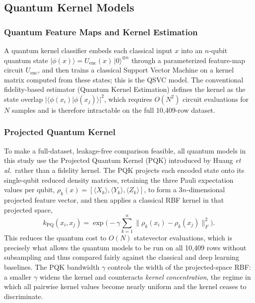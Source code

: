 \documentclass{ieeeaccess}
\begin{document}
\subsection{Quantum Kernel Models}
\label{subsec:quantum_methods}

\subsubsection{Quantum Feature Maps and Kernel Estimation}
A quantum kernel classifier embeds each classical input $x$ into an $n$-qubit quantum state $|\phi(x)\rangle = U_{\text{enc}}(x)\,|0\rangle^{\otimes n}$ through a parameterized feature-map circuit $U_{\text{enc}}$, and then trains a classical Support Vector Machine on a kernel matrix computed from these states; this is the QSVC model. The conventional fidelity-based estimator (Quantum Kernel Estimation) defines the kernel as the state overlap $|\langle\phi(x_i)|\phi(x_j)\rangle|^2$, which requires $O(N^2)$ circuit evaluations for $N$ samples and is therefore intractable on the full 10{,}409-row dataset.

\subsubsection{Projected Quantum Kernel}
To make a full-dataset, leakage-free comparison feasible, all quantum models in this study use the Projected Quantum Kernel (PQK) introduced by Huang \textit{et al.}\ rather than a fidelity kernel. The PQK projects each encoded state onto its single-qubit reduced density matrices, retaining the three Pauli expectation values per qubit, $\rho_k(x)=[\langle X_k\rangle, \langle Y_k\rangle, \langle Z_k\rangle]$, to form a $3n$-dimensional projected feature vector, and then applies a classical RBF kernel in that projected space,
\begin{equation}
k_{\text{PQ}}(x_i,x_j) = \exp\!\Big(-\gamma \sum_{k=1}^{n} \big\lVert \rho_k(x_i)-\rho_k(x_j) \big\rVert_F^2\Big).
\label{eq:pqk}
\end{equation}
This reduces the quantum cost to $O(N)$ statevector evaluations, which is precisely what allows the quantum models to be run on all 10{,}409 rows without subsampling and thus compared fairly against the classical and deep learning baselines. The PQK bandwidth $\gamma$ controls the width of the projected-space RBF: a smaller $\gamma$ widens the kernel and counteracts \textit{kernel concentration}, the regime in which all pairwise kernel values become nearly uniform and the kernel ceases to discriminate.
\end{document}
